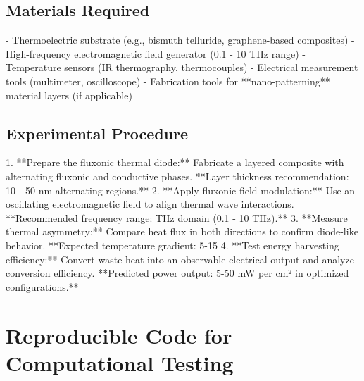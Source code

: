 \documentclass{article}
\begin{document}
\subsection{Materials Required}
- Thermoelectric substrate (e.g., bismuth telluride, graphene-based composites)
- High-frequency electromagnetic field generator (0.1 - 10 THz range)
- Temperature sensors (IR thermography, thermocouples)
- Electrical measurement tools (multimeter, oscilloscope)
- Fabrication tools for **nano-patterning** material layers (if applicable)

\subsection{Experimental Procedure}
1. **Prepare the fluxonic thermal diode:** Fabricate a layered composite with alternating fluxonic and conductive phases. **Layer thickness recommendation: 10 - 50 nm alternating regions.**
2. **Apply fluxonic field modulation:** Use an oscillating electromagnetic field to align thermal wave interactions. **Recommended frequency range: THz domain (0.1 - 10 THz).**
3. **Measure thermal asymmetry:** Compare heat flux in both directions to confirm diode-like behavior. **Expected temperature gradient: 5-15%
4. **Test energy harvesting efficiency:** Convert waste heat into an observable electrical output and analyze conversion efficiency. **Predicted power output: 5-50 mW per cm² in optimized configurations.**

\section{Reproducible Code for Computational Testing}
\end{document}
